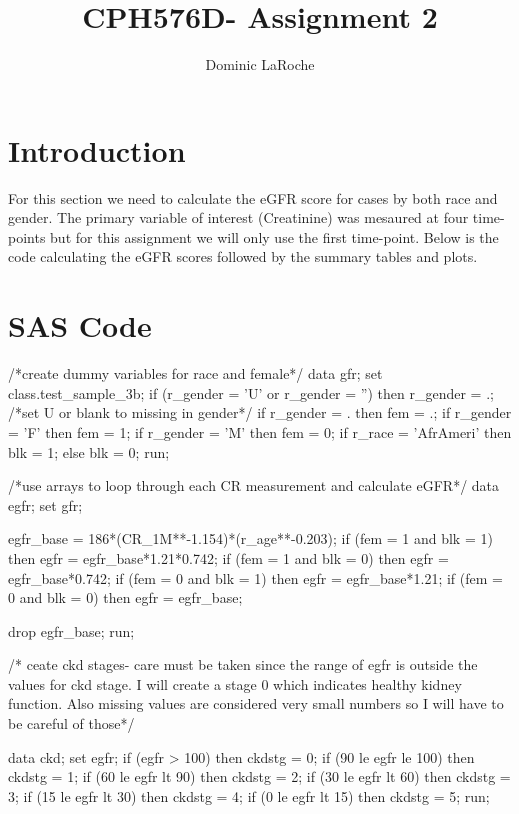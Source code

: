 \documentclass{article}\usepackage[]{graphicx}\usepackage[]{color}
\title{CPH576D- Assignment 2}
\author{Dominic LaRoche}
\begin{document}
\maketitle

\section{Introduction}
For this section we need to calculate the eGFR score for cases by both race and gender.  The primary variable of interest (Creatinine) was mesaured at four time-points but for this assignment we will only use the first time-point.  Below is the code calculating the eGFR scores followed by the summary tables and plots.\\ 

\section{SAS Code}


\begin{Datastep}
/*create dummy variables for race and female*/
data gfr;
set class.test_sample_3b;
if (r_gender = 'U' or r_gender = '') then r_gender = .; /*set U or blank to missing in gender*/
if r_gender = . then fem = .;
if r_gender = 'F' then fem = 1;
if r_gender = 'M' then fem = 0; 
if r_race = 'AfrAmeri' then blk = 1;
  else blk = 0;
run;

/*use arrays to loop through each CR measurement
and calculate eGFR*/
data egfr;
set gfr;

  egfr_base = 186*(CR_1M**-1.154)*(r_age**-0.203);
	if (fem = 1 and blk = 1) then egfr = egfr_base*1.21*0.742;
	if (fem = 1 and blk = 0) then egfr = egfr_base*0.742;
	if (fem = 0 and blk = 1) then egfr = egfr_base*1.21;
	if (fem = 0 and blk = 0) then egfr = egfr_base;
	
drop egfr_base;
run;


/* ceate ckd stages- care must be taken since the range of egfr 
is outside the values for ckd stage.  
I will create a stage 0 which indicates healthy kidney function. 
Also missing values are considered very 
small numbers so I will have to be careful of those*/

data ckd;
set egfr;
if (egfr > 100) then ckdstg = 0;
if (90 le egfr le 100) then ckdstg = 1;
if (60 le egfr lt 90) then ckdstg = 2;
if (30 le egfr lt 60) then ckdstg = 3;
if (15 le egfr lt 30) then ckdstg = 4;
if (0 le egfr lt 15) then ckdstg = 5;
run;

\end{Datastep}
\end{document}
